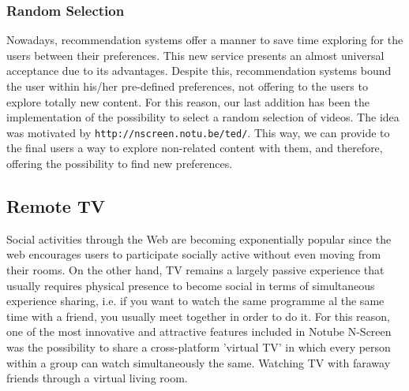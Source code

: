 \documentclass{acm_proc_article-sp}
\begin{document}
\subsubsection{Random Selection}
Nowadays, recommendation systems offer a manner to save time  exploring for the users between their preferences.
This new service presents an almost universal acceptance due to its advantages\cite{bobadilla2013recommender}. Despite this, recommendation systems bound the user within his/her pre-defined preferences, not offering to the users to explore totally new content. For this reason, our last addition has been the implementation of the possibility to select a random selection of videos. The idea was motivated by \texttt{http://nscreen.notu.be/ted/}. This way, we can provide to the final users a way to explore non-related content with them, and therefore, offering the possibility to find new preferences. 

\subsection{Remote TV}

Social activities through the Web are becoming exponentially popular since the web encourages users to  participate socially active without even moving from their rooms\cite{schopman2010notube}. On the other hand, TV remains a largely passive experience that usually requires physical presence to become social in terms of simultaneous experience sharing, i.e. if you want to watch the same programme al the same time with a friend, you usually meet together in order to do it. For this reason, one of the most innovative and attractive features included in Notube N-Screen was the possibility to share a cross-platform 'virtual TV' in which every person within a group can watch simultaneously the same. Watching TV with faraway friends through a virtual living room.
\end{document}

